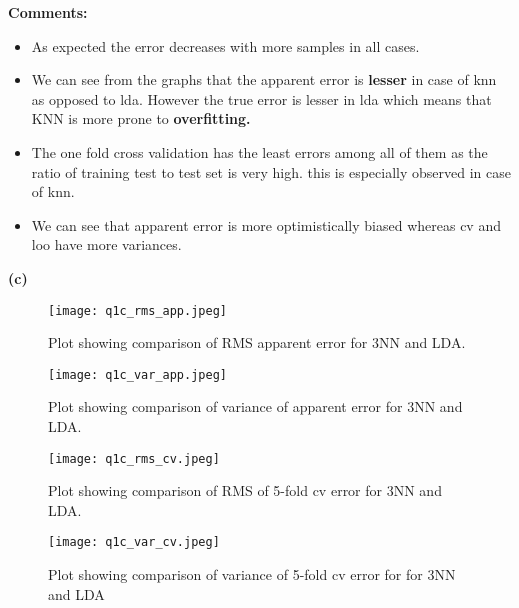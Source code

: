 \documentclass[paper=a4, fontsize=11pt]{scrartcl} %
\begin{document}
\textbf{Comments:}
\begin{itemize}

\item As expected the error decreases with more samples in all cases.
\item We can see from the graphs that the apparent error is \textbf{lesser} in case of knn as opposed to lda. However the true error is lesser in lda which means that KNN is more prone to \textbf{overfitting.}

\item The one fold cross validation has the least errors among all of them as the ratio of training test to test set is very high. this is especially observed in case of knn.

\item We can see that apparent error is more optimistically biased whereas cv and loo have more variances.

 
\end{itemize}




\newpage

\textbf{(c)}
\begin{center}
\begin{figure}[H]
\hspace{2 cm}
\texttt{[image: q1c\_rms\_app.jpeg]} 
\caption{Plot showing comparison of RMS apparent error for 3NN and LDA.}
\end{figure}
\end{center}


\begin{center}
\begin{figure}[H]
\hspace{2 cm}
\texttt{[image: q1c\_var\_app.jpeg]} 
\caption{Plot showing comparison of variance of apparent error for 3NN and LDA.}


\end{figure}
\end{center}


\begin{center}
\begin{figure}[H]
\hspace{2 cm}
\texttt{[image: q1c\_rms\_cv.jpeg]} 
\caption{Plot showing comparison of RMS of 5-fold cv error for 3NN and LDA.}
\end{figure}
\end{center}


\begin{center}
\begin{figure}[H]
\hspace{2 cm}
\texttt{[image: q1c\_var\_cv.jpeg]} 
\caption{Plot showing comparison of variance of 5-fold cv error for for 3NN and LDA}

\end{figure}
\end{center}
\end{document}
